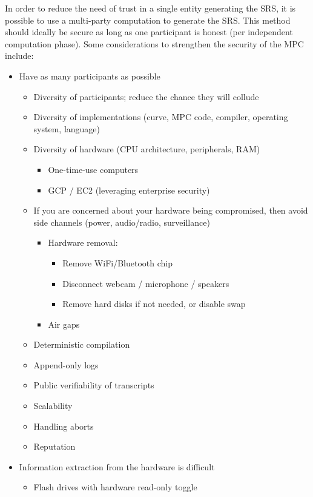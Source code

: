 In order to reduce the need of trust in a single entity generating the SRS, it is possible to use a multi-party computation to generate the SRS. 
This method should ideally be secure as long as one participant is honest (per independent computation phase). 
Some considerations to strengthen the security of the MPC include:
\begin{itemize}[label={- }]
    \item Have as many participants as possible
				\begin{itemize}
        \item Diversity of participants; reduce the chance they will collude
        \item Diversity of implementations (curve, MPC code, compiler, operating system, language)
        \item Diversity of hardware (CPU architecture, peripherals, RAM)
						\begin{itemize}[label={- }]
            \item One-time-use computers
            \item GCP / EC2 (leveraging enterprise security)
						\end{itemize}
        \item If you are concerned about your hardware being compromised, then avoid side channels (power, audio/radio, surveillance)
            \begin{itemize}[label={- }]
						\item Hardware removal:
								\begin{itemize}[label={- }]
                \item Remove WiFi/Bluetooth chip
                \item Disconnect webcam / microphone / speakers
                \item Remove hard disks if not needed, or disable swap
								\end{itemize}
            \item Air gaps
						\end{itemize}
        \item Deterministic compilation
        \item Append-only logs
        \item Public verifiability of transcripts
        \item Scalability
        \item Handling aborts
        \item Reputation
			\end{itemize}
    \item Information extraction from the hardware is difficult
				\begin{itemize}[label={- }]
        \item Flash drives with hardware read-only toggle
				\end{itemize}
\end{itemize}

